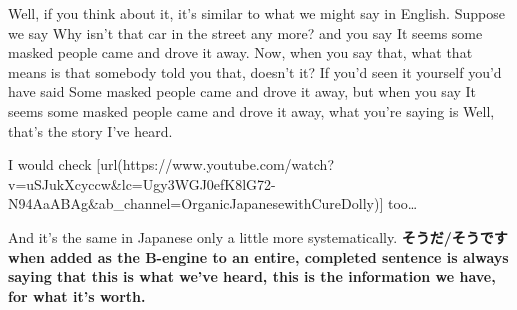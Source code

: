 {}

Well, if you think about it, it's similar to what we might say in English. Suppose we say Why isn't that car in the street any more? and you say It seems some masked people came and drove it away. Now, when you say that, what that means is that somebody told you that, doesn't it? If you'd seen it yourself you'd have said Some masked people came and drove it away, but when you say It seems some masked people came and drove it away, what you're saying is Well, that's the story I've heard.

I would check [url(https://www.youtube.com/watch?v=uSJukXcyccw&lc=Ugy3WGJ0efK8lG72-N94AaABAg&ab_channel=OrganicJapanesewithCureDolly)] too\ldots{}

And it's the same in Japanese only a little more systematically. {\bf そうだ/そうです when added as the B-engine to an entire, completed sentence is always} {\bf saying that this is what we've heard, this is the information we have, for what it's worth.}

\stopsectionlevel

\stopsectionlevel
